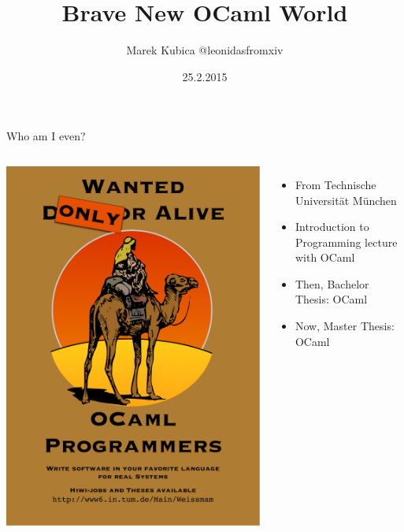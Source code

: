 \documentclass{beamer}
\title{Brave New OCaml World}
\author{Marek Kubica @leonidasfromxiv}
\institute{Lambda Days}
\date{25.2.2015}
\begin{document}
\maketitle

\begin{frame}{Who am I even?}
  \begin{columns}[c]
      \includegraphics[height=0.8\textheight]{programmers}
      \begin{itemize}
        \item From Technische Universität München
        \item Introduction to Programming lecture with OCaml
        \item Then, Bachelor Thesis: OCaml
        \item Now, Master Thesis: OCaml
      \end{itemize}
  \end{columns}
\end{frame}
\end{document}
